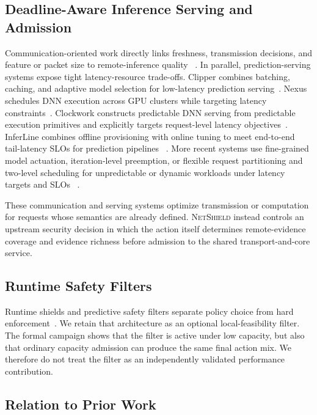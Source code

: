 \documentclass[10pt,journal]{IEEEtran}
\newcommand{\NetShield}{\textsc{NetShield}}
\begin{document}
\subsection{Deadline-Aware Inference Serving and Admission}

Communication-oriented work directly links freshness, transmission
decisions, and feature or packet size to remote-inference quality
~\cite{shisher2024timely,ari2026goal}. In parallel, prediction-serving
systems expose tight latency-resource trade-offs.
Clipper combines batching, caching, and adaptive model selection for
low-latency prediction serving~\cite{crankshaw2017clipper}.
Nexus schedules DNN execution across GPU clusters while targeting
latency constraints~\cite{shen2019nexus}. Clockwork constructs predictable
DNN serving from predictable execution primitives and explicitly targets
request-level latency objectives~\cite{gujarati2020clockwork}.
InferLine combines offline provisioning with online tuning to meet
end-to-end tail-latency SLOs for prediction pipelines
~\cite{crankshaw2020inferline}.
More recent systems use fine-grained model actuation, iteration-level
preemption, or flexible request partitioning and two-level scheduling for
unpredictable or dynamic workloads under latency targets and SLOs
~\cite{khare2025superserve,wu2026fastserve,ruan2026libra}.

These communication and serving systems optimize transmission or
computation for requests whose semantics are already defined.
\NetShield{} instead controls an upstream security decision in which the
action itself determines remote-evidence coverage and evidence richness
before admission to the shared transport-and-core service.

\subsection{Runtime Safety Filters}

Runtime shields and predictive safety filters separate policy choice
from hard enforcement~\cite{alshiekh2018shielding,wabersich2021filter}.
We retain that architecture as an optional local-feasibility filter.
The formal campaign shows that the filter is active under low capacity,
but also that ordinary capacity admission can produce the same final
action mix. We therefore do not treat the filter as an independently
validated performance contribution.

\subsection{Relation to Prior Work}
\end{document}
